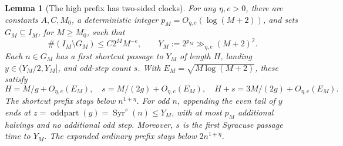 \documentclass[11pt]{article}
\newtheorem{lemma}[proposition]{Lemma}
\theoremstyle{remark}\newtheorem{remark}[proposition]{Remark}
\newcommand{\Syr}{\operatorname{Syr}}
\begin{document}
\begin{lemma}[The high prefix has two-sided clocks]
\label{lem:shaik-high-two-sided}
For any \(\eta,e>0\), there are constants \(A,C,M_0\), a
deterministic integer \(p_M=O_{\eta,e}(\log(M+2))\), and sets
\(G_M\subseteq I_M\), for \(M\ge M_0\), such that
\[
 \#(I_M\setminus G_M)\le C2^M M^{-e},\qquad
 Y_M:=2^{p_M}\gg_{\eta,e}(M+2)^2.
\]
Each \(n\in G_M\) has a first shortcut passage to \(Y_M\) of
length \(H\), landing \(y\in(Y_M/2,Y_M]\), and odd-step count \(s\).
With \(E_M=\sqrt{M\log(M+2)}\), these satisfy
\begin{equation}\label{eq:shaik-high-three-clocks}
 H=M/g+O_{\eta,e}(E_M),\quad
 s=M/(2g)+O_{\eta,e}(E_M),\quad
 H+s=3M/(2g)+O_{\eta,e}(E_M).
\end{equation}
The shortcut prefix stays below \(n^{1+\eta}\).
For odd \(n\), appending the even tail of \(y\) ends at
\(z=\operatorname{oddpart}(y)=\Syr^s(n)\le Y_M\), with at most
\(p_M\) additional halvings and no additional odd step.
Moreover, \(s\) is the first Syracuse passage time to \(Y_M\).
The expanded ordinary prefix stays below \(2n^{1+\eta}\).
\end{lemma}
\end{document}
